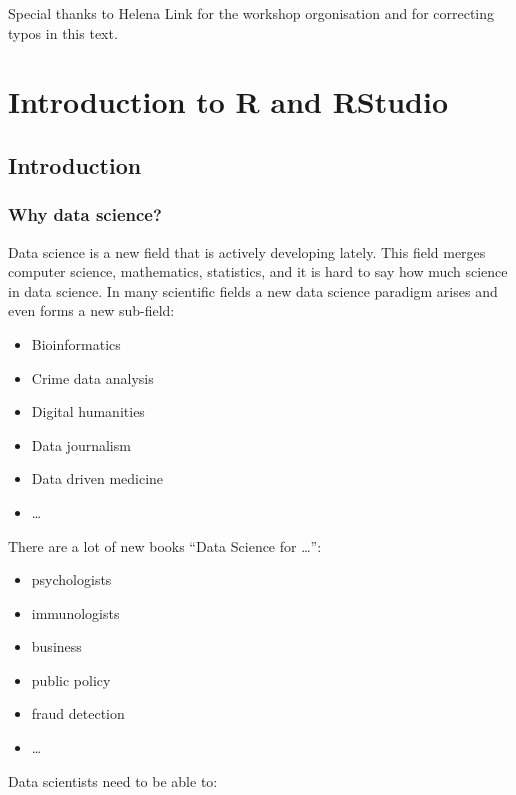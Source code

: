 \documentclass[
]{book}
\providecommand{\tightlist}{%
  \setlength{\itemsep}{0pt}\setlength{\parskip}{0pt}}
\begin{document}
Special thanks to Helena Link for the workshop orgonisation and for correcting typos in this text.

\hypertarget{intro}{%
\chapter{Introduction to R and RStudio}\label{intro}}

\hypertarget{introduction}{%
\section{Introduction}\label{introduction}}

\hypertarget{why-data-science}{%
\subsection{Why data science?}\label{why-data-science}}

Data science is a new field that is actively developing lately. This field merges computer science, mathematics, statistics, and it is hard to say how much science in data science. In many scientific fields a new data science paradigm arises and even forms a new sub-field:

\begin{itemize}
\tightlist
\item
  Bioinformatics
\item
  Crime data analysis
\item
  Digital humanities
\item
  Data journalism
\item
  Data driven medicine
\item
  \ldots{}
\end{itemize}

There are a lot of new books ``Data Science for \ldots{}'':

\begin{itemize}
\tightlist
\item
  psychologists \citep{hansjoerg19}
\item
  immunologists \citep{thomas19}
\item
  business \citep{provost13}
\item
  public policy \citep{brooks13}
\item
  fraud detection \citep{baesens15}
\item
  \ldots{}
\end{itemize}

Data scientists need to be able to:
\end{document}
